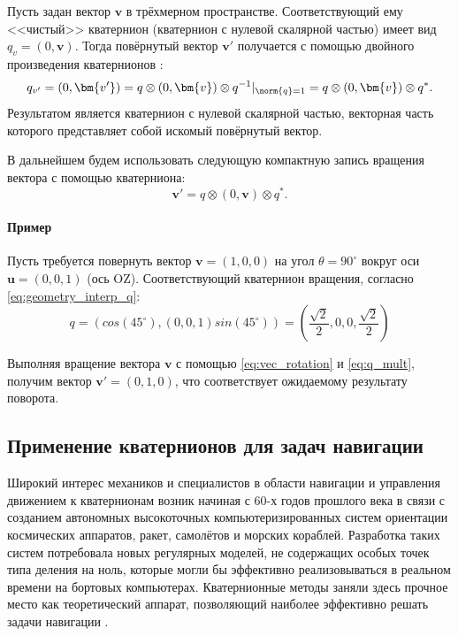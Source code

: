 Пусть задан вектор $\bm{v}$ в трёхмерном пространстве. Соответствующий ему <<чистый>> кватернион (кватернион с нулевой скалярной частью) имеет вид $q_v = (0, \bm{v})$. Тогда повёрнутый вектор $\bm{v'}$ получается с помощью двойного произведения кватернионов \cite{salamin1974quaternions, lee1991stereo}:
\begin{equation}
	q_{v'} = (0, \bm{v'}) = q \otimes(0, \bm{v}) \otimes q^{-1} |_{\norm{q} = 1} = q \otimes(0, \bm{v}) \otimes q^{*}.
\end{equation}
Результатом является кватернион с нулевой скалярной частью, векторная часть которого представляет собой искомый повёрнутый вектор.

В дальнейшем будем использовать следующую компактную запись вращения вектора с помощью кватерниона:
\begin{equation}
\label{eq:vec_rotation}
	\bm{v'} = q \otimes(0, \bm{v}) \otimes q^{*}.
\end{equation}


\paragraph{Пример}
Пусть требуется повернуть вектор $\bm{v} = (1, 0, 0)$ на угол $\theta = 90 ^\circ$ вокруг оси $\bm{u} = (0, 0, 1)$ (ось OZ). Соответствующий кватернион вращения, согласно \eqref{eq:geometry_interp_q}:
\begin{equation*}
	q = \left( cos(45 ^\circ), (0, 0, 1) sin(45 ^\circ) \right) = \left( \frac{\sqrt{2}}{2}, 0, 0, \frac{\sqrt{2}}{2} \right) 
\end{equation*}

Выполняя вращение вектора $\bm{v}$ с помощью \eqref{eq:vec_rotation} и \eqref{eq:q_mult}, получим вектор $\bm{v'} = (0, 1, 0)$, что соответствует ожидаемому результату поворота.


\subsection{Применение кватернионов для задач навигации}

Широкий интерес механиков и специалистов в области навигации и управления движением к кватернионам возник начиная с 60-х годов прошлого века в связи с созданием автономных высокоточных компьютеризированных систем ориентации космических аппаратов, ракет, самолётов и морских кораблей. Разработка таких систем потребовала новых регулярных моделей, не содержащих особых точек типа деления на ноль, которые могли бы эффективно реализовываться в реальном времени на бортовых компьютерах. Кватернионные методы заняли здесь прочное место как теоретический аппарат, позволяющий наиболее эффективно решать задачи навигации .


